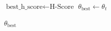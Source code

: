 \documentclass[11pt, a4paper, copyright, gdm]{google}
\theoremstyle{definition}
\begin{document}
\begin{algorithm}[tb]
\begin{algorithmic}[1]
        \State $\text{best\_h\_score} \gets \text{H-Score}$
        \State $\theta_{\text{best}} \gets \theta_t$
    \EndIf
\EndFor

\State \Return $\theta_{\text{best}}$
\end{algorithmic}
\end{algorithm}
\end{document}
